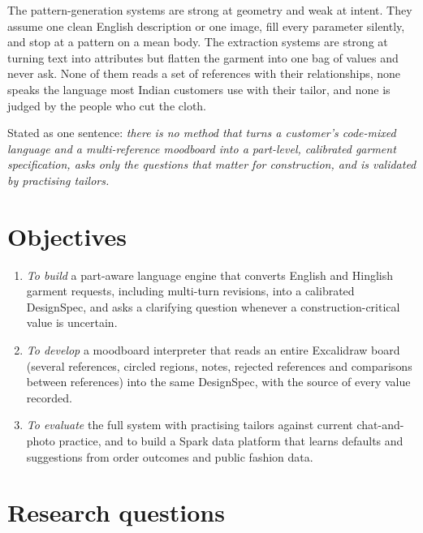 The pattern-generation systems are strong at geometry and weak at intent. They assume one clean English description or one image, fill every parameter silently, and stop at a pattern on a mean body. The extraction systems are strong at turning text into attributes but flatten the garment into one bag of values and never ask. None of them reads a set of references with their relationships, none speaks the language most Indian customers use with their tailor, and none is judged by the people who cut the cloth.

Stated as one sentence: \emph{there is no method that turns a customer's code-mixed language and a multi-reference moodboard into a part-level, calibrated garment specification, asks only the questions that matter for construction, and is validated by practising tailors.}

\section{Objectives}

\begin{enumerate}
\item[O1.] \emph{To build} a part-aware language engine that converts English and Hinglish garment requests, including multi-turn revisions, into a calibrated DesignSpec, and asks a clarifying question whenever a construction-critical value is uncertain.
\item[O2.] \emph{To develop} a moodboard interpreter that reads an entire Excalidraw board (several references, circled regions, notes, rejected references and comparisons between references) into the same DesignSpec, with the source of every value recorded.
\item[O3.] \emph{To evaluate} the full system with practising tailors against current chat-and-photo practice, and to build a Spark data platform that learns defaults and suggestions from order outcomes and public fashion data.
\end{enumerate}

\section{Research questions}

